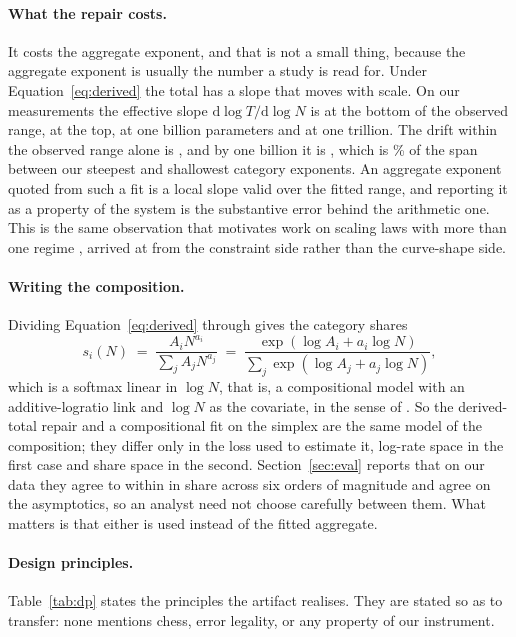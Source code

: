 \documentclass[11pt]{article}
\begin{document}
\paragraph{What the repair costs.}
It costs the aggregate exponent, and that is not a small thing, because the
aggregate exponent is usually the number a study is read for. Under
Equation~\ref{eq:derived} the total has a slope that moves with scale. On our
measurements the effective slope $\mathrm{d}\log T/\mathrm{d}\log N$ is
 at the bottom of the observed range,  at
the top,  at one billion parameters and  at one
trillion. The drift within the observed range alone is , and
by one billion it is , which is \% of the
 span between our steepest and shallowest category exponents. An
aggregate exponent quoted from such a fit is a local slope valid over the fitted
range, and reporting it as a property of the system is the substantive error behind
the arithmetic one. This is the same observation that motivates work on scaling laws
with more than one regime \citep{caballero2023broken}, arrived at from the
constraint side rather than the curve-shape side.

\paragraph{Writing the composition.}
Dividing Equation~\ref{eq:derived} through gives the category shares
\begin{equation}
s_i(N) \;=\; \frac{A_i N^{a_i}}{\sum_j A_j N^{a_j}}
      \;=\; \frac{\exp(\log A_i + a_i \log N)}{\sum_j \exp(\log A_j + a_j \log N)},
\label{eq:softmax}
\end{equation}
which is a softmax linear in $\log N$, that is, a compositional model with an
additive-logratio link and $\log N$ as the covariate, in the sense of
\citet{aitchison1986statistical}. So the derived-total repair and a compositional
fit on the simplex are the same model of the composition; they differ only in the
loss used to estimate it, log-rate space in the first case and share space in the
second. Section~\ref{sec:eval} reports that on our data they agree to within
 in share across six orders of magnitude and agree on the
asymptotics, so an analyst need not choose carefully between them. What matters is
that either is used instead of the fitted aggregate.

\paragraph{Design principles.}
Table~\ref{tab:dp} states the principles the artifact realises. They are stated so
as to transfer: none mentions chess, error legality, or any property of our
instrument.
\end{document}
